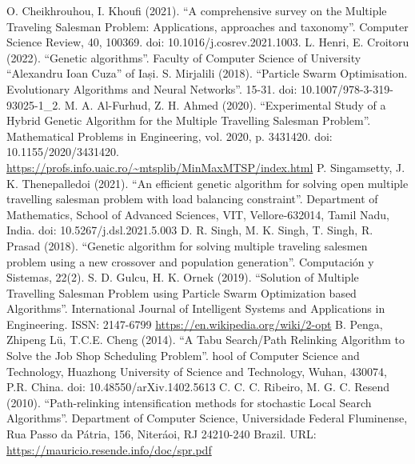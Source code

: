 \documentclass[conference]{IEEEtran}
\begin{document}
\begin{thebibliography}{00}
     O. Cheikhrouhou, I. Khoufi (2021). ``A comprehensive survey on the Multiple Traveling Salesman Problem: Applications, approaches and taxonomy''. Computer Science Review, 40, 100369. doi: 10.1016/j.cosrev.2021.1003.
     L. Henri, E. Croitoru (2022). ``Genetic algorithms''. Faculty of Computer Science of University ``Alexandru Ioan Cuza'' of Iași.
     S. Mirjalili (2018). ``Particle Swarm Optimisation. Evolutionary Algorithms and Neural Networks''. 15-31. doi: 10.1007/978-3-319-93025-1\_2.
     M. A. Al-Furhud, Z. H. Ahmed (2020). ``Experimental Study of a Hybrid Genetic Algorithm for the Multiple Travelling Salesman Problem''. Mathematical Problems in Engineering, vol. 2020, p. 3431420. doi: 10.1155/2020/3431420.
     \url{https://profs.info.uaic.ro/~mtsplib/MinMaxMTSP/index.html}
     P. Singamsetty, J. K. Thenepalledoi (2021). ``An efficient genetic algorithm for solving open multiple travelling salesman problem with load balancing constraint''. Department of Mathematics, School of Advanced Sciences, VIT, Vellore-632014, Tamil Nadu, India. doi: 10.5267/j.dsl.2021.5.003
     D. R. Singh, M. K. Singh, T. Singh, R. Prasad (2018). ``Genetic algorithm for solving multiple traveling salesmen problem using a new crossover and population generation''. Computación y Sistemas, 22(2).
     S. D. Gulcu, H. K. Ornek (2019). ``Solution of Multiple Travelling Salesman Problem using Particle Swarm Optimization based Algorithms''. International Journal of Intelligent Systems and Applications in Engineering. ISSN: 2147-6799
     \url{https://en.wikipedia.org/wiki/2-opt}
     B. Penga, Zhipeng Lü, T.C.E. Cheng (2014). ``A Tabu Search/Path Relinking Algorithm to Solve the Job Shop Scheduling Problem''. hool of Computer Science and Technology, Huazhong University of Science and Technology, Wuhan, 430074, P.R. China. doi: 10.48550/arXiv.1402.5613
     C. C. C. Ribeiro, M. G. C. Resend (2010). ``Path-relinking intensification methods for stochastic Local Search Algorithms''. Department of Computer Science, Universidade Federal Fluminense, Rua Passo da Pátria, 156, Niteráoi, RJ 24210-240 Brazil. URL: \url{https://mauricio.resende.info/doc/spr.pdf}
\end{thebibliography}
    
\end{document}
